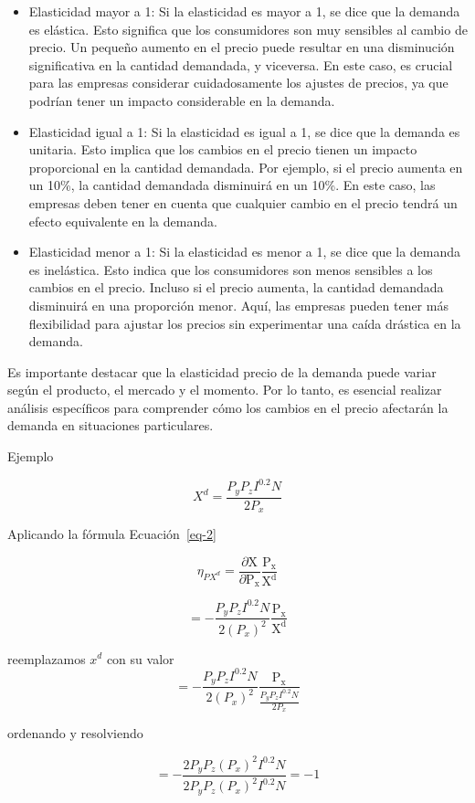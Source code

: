 \documentclass[
  jou,
  floatsintext,
  longtable,
  a4paper,
  nolmodern,
  notxfonts,
  notimes,
  12pt,
  colorlinks=true,linkcolor=blue,citecolor=blue,urlcolor=blue]{apa7}
\begin{document}
\begin{itemize}
\item
  Elasticidad mayor a 1: Si la elasticidad es mayor a 1, se dice que la
  demanda es elástica. Esto significa que los consumidores son muy
  sensibles al cambio de precio. Un pequeño aumento en el precio puede
  resultar en una disminución significativa en la cantidad demandada, y
  viceversa. En este caso, es crucial para las empresas considerar
  cuidadosamente los ajustes de precios, ya que podrían tener un impacto
  considerable en la demanda.
\item
  Elasticidad igual a 1: Si la elasticidad es igual a 1, se dice que la
  demanda es unitaria. Esto implica que los cambios en el precio tienen
  un impacto proporcional en la cantidad demandada. Por ejemplo, si el
  precio aumenta en un 10\%, la cantidad demandada disminuirá en un
  10\%. En este caso, las empresas deben tener en cuenta que cualquier
  cambio en el precio tendrá un efecto equivalente en la demanda.
\item
  Elasticidad menor a 1: Si la elasticidad es menor a 1, se dice que la
  demanda es inelástica. Esto indica que los consumidores son menos
  sensibles a los cambios en el precio. Incluso si el precio aumenta, la
  cantidad demandada disminuirá en una proporción menor. Aquí, las
  empresas pueden tener más flexibilidad para ajustar los precios sin
  experimentar una caída drástica en la demanda.
\end{itemize}

Es importante destacar que la elasticidad precio de la demanda puede
variar según el producto, el mercado y el momento. Por lo tanto, es
esencial realizar análisis específicos para comprender cómo los cambios
en el precio afectarán la demanda en situaciones particulares.

Ejemplo

\[
X^d = \frac{P_y P_z I^{0.2} N}{2 P_x}
\]

Aplicando la fórmula Ecuación~\ref{eq-2}

\[ 
\eta _{PX^d} = \frac{\partial \mathrm{X}}{\partial \mathrm{P_x}} \frac{\mathrm{P_x}}{\mathrm{X^d}} 
\]

\[
= - \frac{P_y P_z I^{0.2} N}{2 (P_x)^2} \frac{\mathrm{P_x}}{\mathrm{X^d} }
\]

reemplazamos \(x^d\) con su valor \[
= - \frac{P_y P_z I^{0.2} N}{2 (P_x)^2} \frac{\mathrm{P_x}}{\frac{P_y P_z I^{0.2} N}{2 P_x} }
\]

ordenando y resolviendo

\[
= - \frac{2 P_y P_z (P_x)^2 I^{0.2} N}{2 P_y P_z (P_x)^2 I^{0.2} N} = -1
\]
\end{document}
